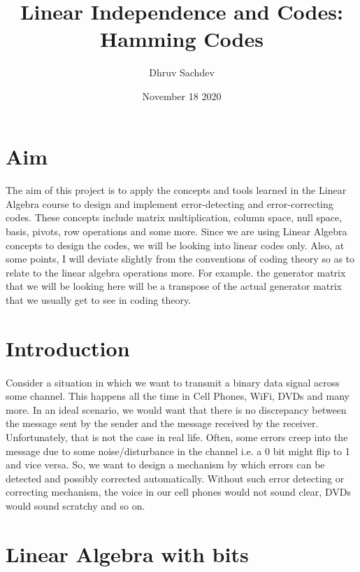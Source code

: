\documentclass[11pt,a4paper]{article}
\title{Linear Independence and Codes: Hamming Codes}
\author{Dhruv Sachdev}
\date{November 18 2020}
\begin{document}
\maketitle

\section{Aim}
\paragraph{}
The aim of this project is to apply the concepts and tools learned in the Linear Algebra course to design and implement error-detecting and error-correcting codes. These concepts include matrix multiplication, column space, null space, basis, pivots, row operations and some more. Since we are using Linear Algebra concepts to design the codes, we will be looking into linear codes only. Also, at some points, I will deviate slightly from the conventions of coding theory so as to relate to the linear algebra operations more. For example. the generator matrix that we will be looking here will be a transpose of the actual generator matrix that we usually get to see in coding theory.

\section{Introduction}
\paragraph{}
Consider a situation in which we want to transmit a binary data signal across some channel. This happens all the time in Cell Phones, WiFi, DVDs and many more. In an ideal scenario, we would want that there is no discrepancy between the message sent by the sender and the message received by the receiver. Unfortunately, that is not the case in real life. Often, some errors creep into the message due to some noise/disturbance in the channel i.e. a 0 bit might flip to 1 and vice versa. So, we want to design a mechanism by which errors can be detected and possibly corrected automatically. Without such error detecting or correcting mechanism, the voice in our cell phones would not sound clear, DVDs would sound scratchy and so on.

\section{Linear Algebra with bits}
\end{document}
